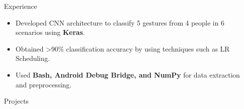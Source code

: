 \documentclass{resume} %
\begin{document}
\begin{workSection}{Experience}
\begin{itemize}
        \item Developed CNN architecture to classify 5 gestures from 4 people in 6 scenarios using \textbf{Keras}. %
        \item Obtained >90\% classification accuracy by using techniques such as LR Scheduling. %
        \item Used \textbf{Bash, Android Debug Bridge, and NumPy} for data extraction and preprocessing.
    \end{itemize}

\end{workSection}

\begin{workSection}{Projects}






\end{workSection}
\end{document}
